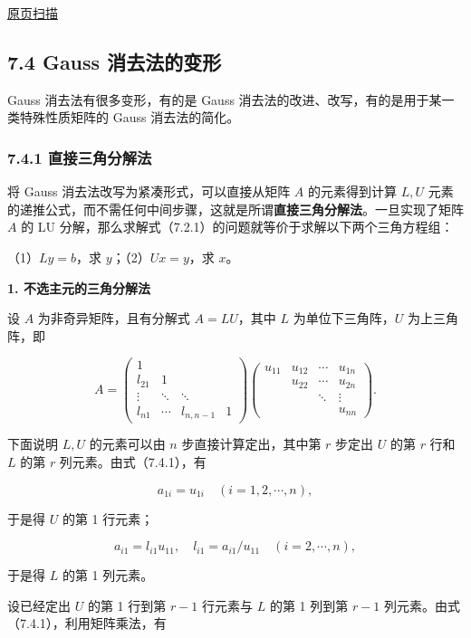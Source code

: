 \documentclass[
  10pt,
  fontset=fandol]{ctexart}
\begin{document}
\href{../../source-images/pdf-191.jpeg}{原页扫描}

\subsection{7.4 Gauss 消去法的变形}\label{gauss-ux6d88ux53bbux6cd5ux7684ux53d8ux5f62}

Gauss 消去法有很多变形，有的是 Gauss 消去法的改进、改写，有的是用于某一类特殊性质矩阵的 Gauss 消去法的简化。

\subsubsection{7.4.1 直接三角分解法}\label{ux76f4ux63a5ux4e09ux89d2ux5206ux89e3ux6cd5}

将 Gauss 消去法改写为紧凑形式，可以直接从矩阵 \(A\) 的元素得到计算 \(L,U\) 元素的递推公式，而不需任何中间步骤，这就是所谓\textbf{直接三角分解法}。一旦实现了矩阵 \(A\) 的 LU 分解，那么求解式（7.2.1）的问题就等价于求解以下两个三角方程组：

（1）\(Ly=b\)，求 \(y\)；（2）\(Ux=y\)，求 \(x\)。

\textbf{1. 不选主元的三角分解法}

设 \(A\) 为非奇异矩阵，且有分解式 \(A=LU\)，其中 \(L\) 为单位下三角阵，\(U\) 为上三角阵，即

\[
A=\begin{pmatrix}
1&&&\\
l_{21}&1&&\\
\vdots&\ddots&\ddots&\\
l_{n1}&\cdots&l_{n,n-1}&1
\end{pmatrix}
\begin{pmatrix}
u_{11}&u_{12}&\cdots&u_{1n}\\
&u_{22}&\cdots&u_{2n}\\
&&\ddots&\vdots\\
&&&u_{nn}
\end{pmatrix}.
\tag{7.4.1}
\]

下面说明 \(L,U\) 的元素可以由 \(n\) 步直接计算定出，其中第 \(r\) 步定出 \(U\) 的第 \(r\) 行和 \(L\) 的第 \(r\) 列元素。由式（7.4.1），有

\[a_{1i}=u_{1i}\quad(i=1,2,\cdots,n),\]

于是得 \(U\) 的第 1 行元素；

\[a_{i1}=l_{i1}u_{11},\quad l_{i1}=a_{i1}/u_{11}\quad(i=2,\cdots,n),\]

于是得 \(L\) 的第 1 列元素。

设已经定出 \(U\) 的第 1 行到第 \(r-1\) 行元素与 \(L\) 的第 1 列到第 \(r-1\) 列元素。由式（7.4.1），利用矩阵乘法，有
\end{document}
